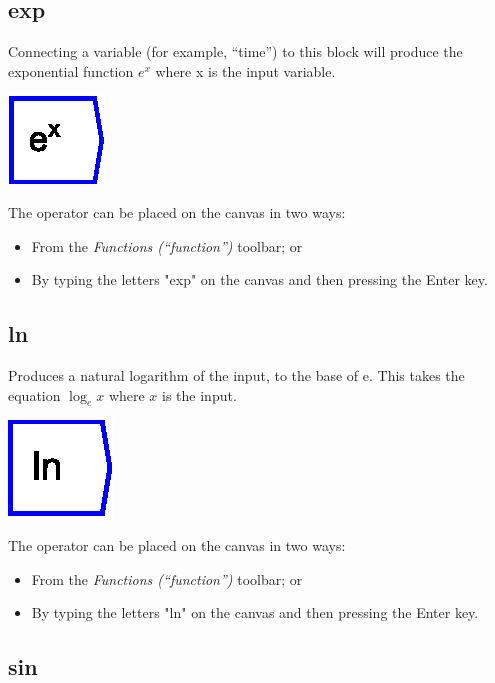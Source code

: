\subsection{exp}

\label{Operation:exp} Connecting a variable (for example, ``time'')
to this block will produce the exponential function $e^{x}$ where
x is the input variable.

\includegraphics{images/Exponential}

The operator can be placed on the canvas in two ways:
\begin{itemize}
\item From the \emph{Functions (``function'')} toolbar; or 
\item By typing the letters "exp" on the canvas and then pressing the
Enter key. 
\end{itemize}

\subsection{ln}

\label{Operation:ln} Produces a natural logarithm of the input, to
the base of e. This takes the equation $\log_{e}x$ where $x$ is
the input.

\includegraphics{images/ln}

The operator can be placed on the canvas in two ways:
\begin{itemize}
\item From the \emph{Functions (``function'')} toolbar; or 
\item By typing the letters "ln" on the canvas and then pressing the Enter
key. 
\end{itemize}

\subsection{sin}

